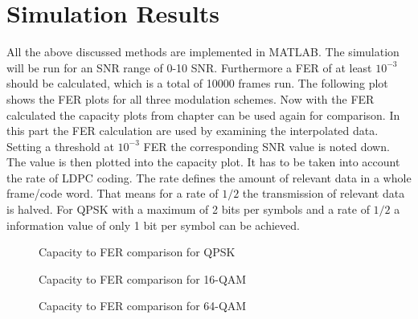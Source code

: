 \section{Simulation Results}
All the above discussed methods are implemented in MATLAB.
The simulation will be run for an SNR range of 0-10 SNR. Furthermore a \gls{FER} of at least $10^{-3}$ should be calculated, which is a total of 10000 frames run. The following plot shows the \gls{FER} plots for all three modulation schemes.
Now with the  \gls{FER} calculated the capacity plots from chapter  can be used again for comparison. In this part the FER calculation are used by examining the interpolated data. Setting a threshold at $10^{-3}$ FER the corresponding SNR value is noted down. The value is then plotted into the capacity plot. It has to be taken into account the rate of \gls{LDPC} coding. The rate defines the amount of relevant data in a whole frame/code word. That means for a rate of $1/2$ the transmission of relevant data is halved. For QPSK with a maximum of 2 bits per symbols and a rate of $1/2$ a information value of only 1 bit per symbol can be achieved.
\newline
\begin{figure}[!htb]
	\setlength{}
	\setlength\fheight{0.4\textheight}
	\centering
	
	\caption{Capacity to FER comparison for QPSK}
	\label{fig:llr1}
\end{figure}
\begin{figure}[!htb]
	\setlength{}
	\setlength\fheight{0.4\textheight}	
	\centering
	
	\caption{Capacity to FER comparison for 16-QAM}
	\label{fig:llr2}
\end{figure}
\begin{figure}[!h]
	\setlength{}
	\setlength\fheight{0.4\textheight}
	\centering
	
	\caption{Capacity to FER comparison for 64-QAM}
	\label{fig:llr3}
\end{figure}

